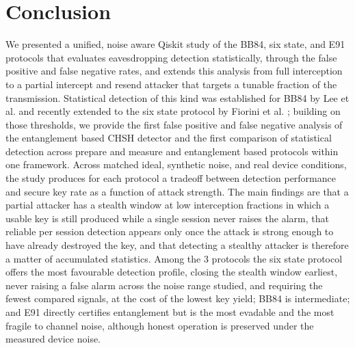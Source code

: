 \documentclass[conference]{IEEEtran}
\begin{document}
\section{Conclusion}
We presented a unified, noise aware Qiskit study of the BB84, six state, and E91
protocols that evaluates eavesdropping detection statistically, through the false
positive and false negative rates, and extends this analysis from full
interception to a partial intercept and resend attacker that targets a tunable
fraction of the transmission. Statistical detection of this kind was established
for BB84 by Lee et al. \cite{lee2022eavesdropping} and recently extended to the
six state protocol by Fiorini et al. \cite{fiorini2025sixstate}; building on those
thresholds, we provide the first false positive and false negative analysis of
the entanglement based CHSH detector and the first comparison of statistical
detection across prepare and measure and entanglement based protocols within one
framework. Across matched ideal, synthetic noise, and real device conditions, the
study produces for each protocol a tradeoff between detection performance and
secure key rate as a function of attack strength. The main findings are that a
partial attacker has a stealth window at low interception fractions in which a
usable key is still produced while a single session never raises the alarm, that
reliable per session detection appears only once the attack is strong enough to
have already destroyed the key, and that detecting a stealthy attacker is
therefore a matter of accumulated statistics. Among the 3 protocols the six state
protocol offers the most favourable detection profile, closing the stealth window
earliest, never raising a false alarm across the noise range studied, and
requiring the fewest compared signals, at the cost of the lowest key yield; BB84
is intermediate; and E91 directly certifies entanglement but is the most evadable
and the most fragile to channel noise, although honest operation is preserved
under the measured device noise.
\end{document}
